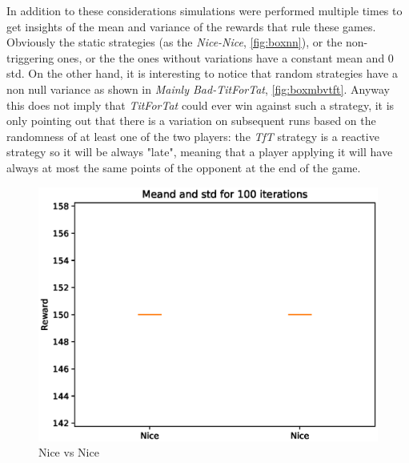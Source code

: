 \documentclass[journal,a4paper,10pt,twoside]{IEEEtran} %
\begin{document}
In addition to these considerations simulations were performed multiple times to get insights of the mean and variance of the rewards that rule these games. Obviously the static strategies (as the \textit{Nice-Nice}, \autoref{fig:boxnn}), or the non-triggering ones, or the the ones without variations have a constant mean and $0$ std. On the other hand, it is interesting to notice that random strategies have a non null variance as shown in \textit{Mainly Bad-TitForTat}, \autoref{fig:boxmbvtft}. Anyway this does not imply that \textit{TitForTat} could ever win against such a strategy, it is only pointing out that there is a variation on subsequent runs based on the randomness of at least one of the two players: the \textit{TfT} strategy is a reactive strategy so it will be always "late", meaning that a player applying it will have always at most the same points of the opponent at the end of the game.

\begin{figure}[!ht]
    \centering
    \includegraphics[width=1\columnwidth]{../img/ipd2p/ipd2p-boxplot-Nice-Nice}
    \caption{Nice vs Nice}
    \label{fig:boxnn}
\end{figure}
\end{document}
